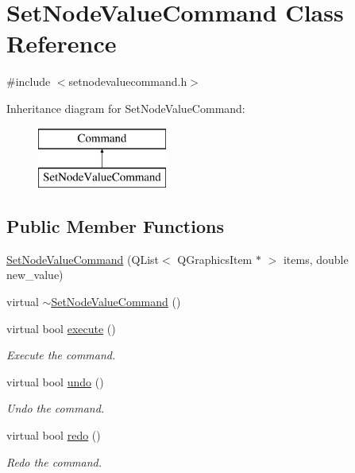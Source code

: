 \hypertarget{class_set_node_value_command}{}\section{Set\+Node\+Value\+Command Class Reference}
\label{class_set_node_value_command}


{\ttfamily \#include $<$setnodevaluecommand.\+h$>$}

Inheritance diagram for Set\+Node\+Value\+Command\+:\begin{figure}[H]
\begin{center}
\leavevmode
\includegraphics[height=2.000000cm]{d1/d6e/class_set_node_value_command}
\end{center}
\end{figure}
\subsection*{Public Member Functions}
\begin{DoxyCompactItemize}
\item 
\mbox{\hyperlink{class_set_node_value_command_ae9b709903f25062fe1d9f11aa77f8af3}{Set\+Node\+Value\+Command}} (Q\+List$<$ Q\+Graphics\+Item $\ast$ $>$ items, double new\+\_\+value)
\item 
virtual \mbox{\hyperlink{class_set_node_value_command_afd440c5c1059d410c90fe0dfb9b6349a}{$\sim$\+Set\+Node\+Value\+Command}} ()
\item 
virtual bool \mbox{\hyperlink{class_set_node_value_command_a0330dab0773c047deefe2eb551d6fc5e}{execute}} ()
\begin{DoxyCompactList}\small\item\em Execute the command. \end{DoxyCompactList}\item 
virtual bool \mbox{\hyperlink{class_set_node_value_command_a794bfa7e64469fa6528179d2ca807cc3}{undo}} ()
\begin{DoxyCompactList}\small\item\em Undo the command. \end{DoxyCompactList}\item 
virtual bool \mbox{\hyperlink{class_set_node_value_command_a839cb93ffcaab91e245995aa367e07c7}{redo}} ()
\begin{DoxyCompactList}\small\item\em Redo the command. \end{DoxyCompactList}\end{DoxyCompactItemize}


